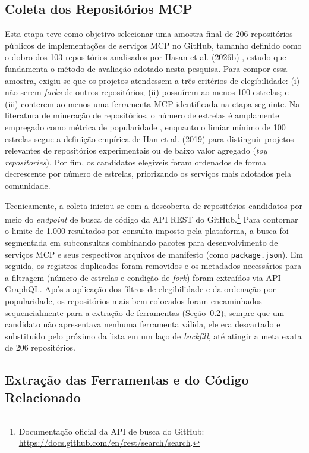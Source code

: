 \subsection{Coleta dos Repositórios MCP}
\label{subsec:coleta}

Esta etapa teve como objetivo selecionar uma amostra final de 206 repositórios públicos de implementações de serviços MCP no GitHub, tamanho definido como o dobro dos 103 repositórios analisados por Hasan et al. (2026b) \nocite{2026arXiv260214878M}, estudo que fundamenta o método de avaliação adotado nesta pesquisa. Para compor essa amostra, exigiu-se que os projetos atendessem a três critérios de elegibilidade: (i) não serem \textit{forks} de outros repositórios; (ii) possuírem ao menos 100 estrelas; e (iii) conterem ao menos uma ferramenta MCP identificada na etapa seguinte. Na literatura de mineração de repositórios, o número de estrelas é amplamente empregado como métrica de popularidade \cite{Borges2016}, enquanto o limiar mínimo de 100 estrelas segue a definição empírica de Han et al. (2019) \nocite{han2019popular} para distinguir projetos relevantes de repositórios experimentais ou de baixo valor agregado (\textit{toy repositories}). Por fim, os candidatos elegíveis foram ordenados de forma decrescente por número de estrelas, priorizando os serviços mais adotados pela comunidade.

Tecnicamente, a coleta iniciou-se com a descoberta de repositórios candidatos por meio do \textit{endpoint} de busca de código da API REST do GitHub.\footnote{Documentação oficial da API de busca do GitHub: \url{https://docs.github.com/en/rest/search/search}.} Para contornar o limite de 1.000 resultados por consulta imposto pela plataforma, a busca foi segmentada em subconsultas combinando pacotes para desenvolvimento de serviços MCP e seus respectivos arquivos de manifesto (como \texttt{package.json}). Em seguida, os registros duplicados foram removidos e os metadados necessários para a filtragem (número de estrelas e condição de \textit{fork}) foram extraídos via API GraphQL. Após a aplicação dos filtros de elegibilidade e da ordenação por popularidade, os repositórios mais bem colocados foram encaminhados sequencialmente para a extração de ferramentas (Seção~\ref{subsec:extracao}); sempre que um candidato não apresentava nenhuma ferramenta válida, ele era descartado e substituído pelo próximo da lista em um laço de \textit{backfill}, até atingir a meta exata de 206 repositórios.

\subsection{Extração das Ferramentas e do Código Relacionado}
\label{subsec:extracao}

